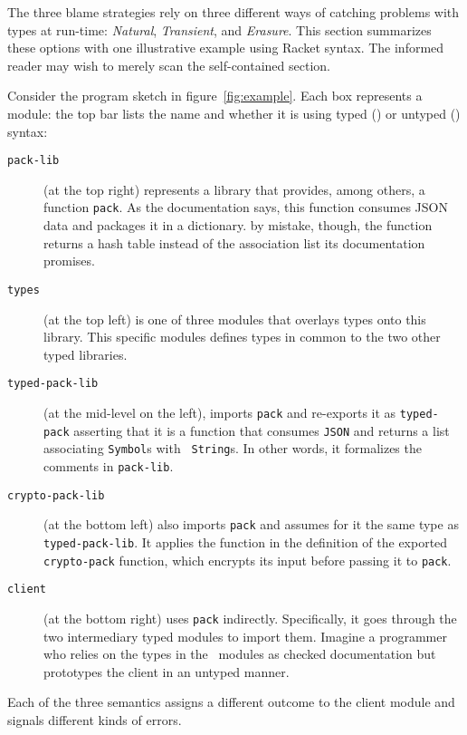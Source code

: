 
The three blame strategies rely on three different ways of catching problems
with types at run-time: {\em Natural\/}, {\em Transient\/}, and {\em
Erasure\/}. This section summarizes these options with one illustrative example
using Racket syntax. The informed reader may wish to merely scan the
self-contained section.

Consider the program sketch in figure~\ref{fig:example}. Each box represents a
module: the top bar lists the name and whether it is using typed (\typecolor) or
untyped (\dyncolor) syntax:
\begin{description}

\item[\texttt{pack-lib}] (at the top right) represents a library that provides,
among others, a function {\tt pack}. As the documentation says, this function
consumes JSON data and packages it in a dictionary. by mistake, though, the
function returns a hash table instead of the association list its documentation
promises.

\item[\texttt{types}] (at the top left) is one of three modules that overlays
types onto this library. This specific modules defines types in common to the
two other typed libraries. 

\item[\texttt{typed-pack-lib}] (at the mid-level on the left), imports {\tt pack}
and re-exports it as \texttt{typed-pack} asserting that it is a function that
consumes {\tt JSON} and returns a list associating {\tt Symbol}s with {\tt
String}s. In other words, it formalizes the comments in {\tt pack-lib}.

\item[\texttt{crypto-pack-lib}] (at the bottom left) also imports \texttt{pack}
and assumes for it the same type as {\tt typed-pack-lib}. It applies the
function in the definition of the exported {\tt crypto-pack} function, which
encrypts its input before passing it to \texttt{pack}.

\item[\texttt{client}] (at the bottom right) uses {\tt pack}
indirectly. Specifically, it goes through the two intermediary typed modules to
import them. Imagine a programmer who relies on the types in the \typecolor\
modules as checked documentation but prototypes the client in an untyped manner.

\end{description}
Each of the three semantics assigns a different outcome to the client module and
signals different kinds of errors. 


